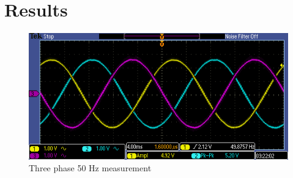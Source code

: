 \section{Results}

\begin{figure}[h!]
\centering
\includegraphics[width=\linewidth]{pictures/three_phase_ampl100.png}
\caption{Three phase 50 Hz measurement}
\label{measurement}
\end{figure}
